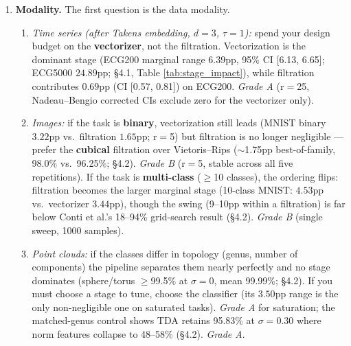 \begin{enumerate}
  \item \textbf{Modality.} The first question is the data modality.
    \begin{enumerate}
      \item \emph{Time series (after Takens embedding, $d{=}3$, $\tau{=}1$):}
        spend your design budget on the \textbf{vectorizer}, not the
        filtration. Vectorization is the dominant stage (ECG200 marginal range
        $6.39$pp, 95\% CI [6.13, 6.65]; ECG5000 $24.89$pp; \S4.1, Table
        \ref{tab:stage_impact}), while filtration contributes $0.69$pp
        (CI [0.57, 0.81]) on ECG200. \emph{Grade A} (r$=$25, Nadeau--Bengio
        corrected CIs exclude zero for the vectorizer only).
      \item \emph{Images:} if the task is \textbf{binary}, vectorization still
        leads (MNIST binary $3.22$pp vs.\ filtration $1.65$pp; r$=$5) but
        filtration is no longer negligible --- prefer the \textbf{cubical}
        filtration over Vietoris--Rips ($\sim$1.75pp best-of-family, 98.0\%
        vs.\ 96.25\%; \S4.2). \emph{Grade B} (r$=$5, stable across all five
        repetitions). If the task is \textbf{multi-class} ($\ge$10 classes),
        the ordering flips: filtration becomes the larger marginal stage
        (10-class MNIST: $4.53$pp vs.\ vectorizer $3.44$pp), though the swing
        (9--10pp within a filtration) is far below Conti et al.'s 18--94\%
        grid-search result (\S4.2). \emph{Grade B} (single sweep, 1000 samples).
      \item \emph{Point clouds:} if the classes differ in topology (genus,
        number of components) the pipeline separates them nearly perfectly and
        no stage dominates (sphere/torus $\ge$99.5\% at $\sigma{=}0$, mean
        99.99\%; \S4.2). If you must choose a stage to tune, choose the
        classifier (its $3.50$pp range is the only non-negligible one on
        saturated tasks). \emph{Grade A} for saturation; the matched-genus
        control shows TDA retains 95.83\% at $\sigma{=}0.30$ where norm
        features collapse to 48--58\% (\S4.2). \emph{Grade A}.
    \end{enumerate}


\end{enumerate}
